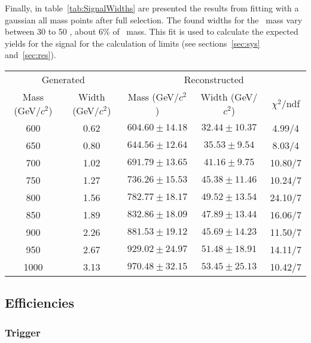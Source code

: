 Finally, in table~\ref{tab:SignalWidths} are presented the results from fitting with a gaussian all mass points after full selection. The found widths for the \Tp~mass vary between 30 to 50 \GeVcc, about 6\% of \Tp~mass. This fit is used to calculate the expected yields for the signal for the calculation of limits (see sections~\ref{sec:sys} and~\ref{sec:res}).

\begin{table*}[htbH]
\begin{center}
\begin{tabular}{|c|c|c|c|c|}
\hline 
\multicolumn{2}{|c}{Generated} & \multicolumn{3}{|c|}{Reconstructed} \\
Mass (GeV/$c^{2}$) & Width (GeV/$c^{2}$) & Mass (GeV/$c^{2}$) & Width (GeV/$c^{2}$) & $\chi^{2} /$ndf\\
\hline
600 & 0.62 &$604.60\pm14.18$ & $32.44\pm10.37$ & 4.99/4\\
650 & 0.80 &$644.56\pm12.64$ & $35.53\pm9.54$ & 8.03/4\\
700 & 1.02 &$691.79\pm13.65$ & $41.16\pm9.75$ & 10.80/7\\
750 & 1.27 &$736.26\pm15.53$ & $45.38\pm11.46$ & 10.24/7\\
800 & 1.56 &$782.77\pm18.17$ & $49.52\pm13.54$ & 24.10/7\\
850 & 1.89 &$832.86\pm18.09$ & $47.89\pm13.44$ & 16.06/7\\
900 & 2.26 &$881.53\pm19.12$ & $45.69\pm14.23$ & 11.50/7\\
950 & 2.67 &$929.02\pm24.97$ & $51.48\pm18.91$ & 14.11/7\\
1000 & 3.13 &$970.48\pm32.15$ & $53.45\pm25.13$ & 10.42/7\\
\hline
\end{tabular}
\caption{Reconstructed mass and width for \Tp~candidate after full analysis selection from a gaussian fit for each signal mass generated. \label{tab:SignalWidths}}
\end{center}
\end{table*}

\subsection{Efficiencies}
\label{sec:eff}

\subsubsection{Trigger}
\label{sec:trigger_ana}


